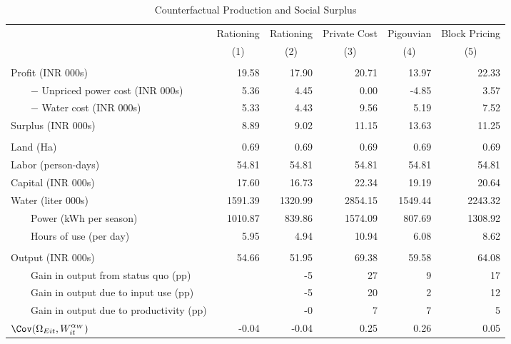 \begin{table}[!ht]
	\centering
		\caption{Counterfactual Production and Social Surplus\label{tab:cfOutcomes}}
\begin{tabular}{lrrrrr}
		\toprule
               &Rationing&Rationing&Private Cost&Pigouvian&Block Pricing\\
&\multicolumn{1}{c}{(1)}&\multicolumn{1}{c}{(2)}&\multicolumn{1}{c}{(3)}&\multicolumn{1}{c}{(4)}&\multicolumn{1}{c}{(5)}\\
		\midrule
		 \addlinespace 
\multicolumn{6}{c}{\emph{A. Profits and social surplus}}\\
		 \addlinespace 
		Profit (INR 000s)&19.58&17.90&20.71&13.97&22.33\\
		~~~~$-$ Unpriced power cost (INR 000s)&5.36&4.45&0.00&-4.85&3.57\\
		~~~~$-$ Water cost (INR 000s)&5.33&4.43&9.56&5.19&7.52\\
\cmidrule(lr){1-1}		Surplus (INR 000s)&8.89&9.02&11.15&13.63&11.25\\
		 \addlinespace 
\multicolumn{6}{c}{\emph{B. Input use}}\\
		 \addlinespace 
		      Land (Ha)&0.69&0.69&0.69&0.69&0.69\\
		Labor (person-days)&54.81&54.81&54.81&54.81&54.81\\
		Capital (INR 000s)&17.60&16.73&22.34&19.19&20.64\\
		Water (liter 000s)&1591.39&1320.99&2854.15&1549.44&2243.32\\
		~~~~Power (kWh per season)&1010.87&839.86&1574.09&807.69&1308.92\\
		~~~~Hours of use (per day)&5.95&4.94&10.94&6.08&8.62\\
		 \addlinespace 
\multicolumn{6}{c}{\emph{C. Output and productivity}}\\
		 \addlinespace 
		Output (INR 000s)&54.66&51.95&69.38&59.58&64.08\\
		~~~~Gain in output from status quo (pp)&&  -5&  27&   9&  17\\
		~~~~Gain in output due to input use (pp)&&  -5&  20&   2&  12\\
		~~~~Gain in output due to productivity (pp)&&  -0&   7&   7&   5\\
		$\Cov(\Omega_{Eit},W_{it}^{\alpha_W})$&-0.04&-0.04&0.25&0.26&0.05\\
		\bottomrule

\end{tabular}
\end{table}
